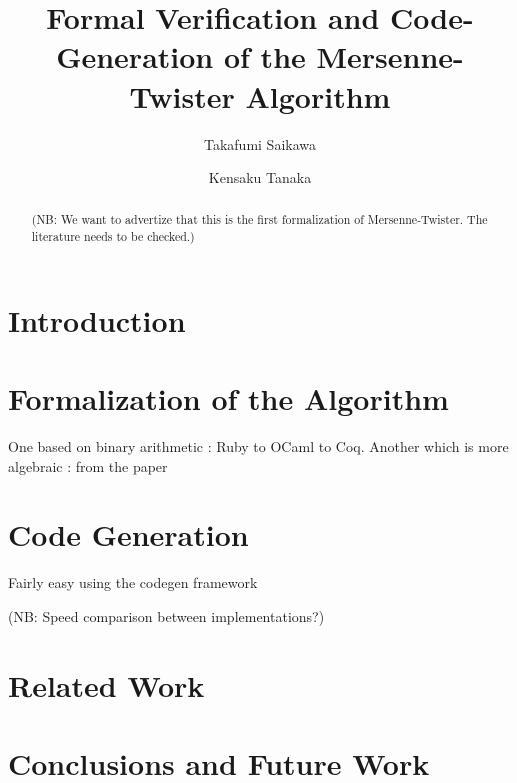 \documentclass{article}
\title{Formal Verification and Code-Generation of the Mersenne-Twister Algorithm}
\author{Takafumi Saikawa \and Kensaku Tanaka}
\theoremstyle{definition}
\newcommand\NB[1]{{\color{red}(NB: #1)}}
\begin{document}
\maketitle

\begin{abstract}
\NB{We want to advertize that this is the first formalization of
  Mersenne-Twister. The literature needs to be checked.}
\end{abstract}

\section{Introduction}

\section{Formalization of the Algorithm}
One based on binary arithmetic : Ruby to OCaml to Coq.
Another which is more algebraic : from the paper\cite{matsumoto1998acm}

\section{Code Generation}
Fairly easy using the codegen framework\cite{tanaka2018jip}

\NB{Speed comparison between implementations?}

\section{Related Work}

\section{Conclusions and Future Work}

% 



\end{document}
